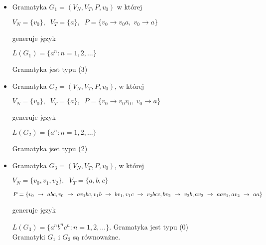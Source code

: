 \documentclass[main.tex]{subfiles}
\begin{document}
    \begin{itemize}
        \item Gramatyka $G_1 = (V_N,V_T,P,v_0)$ w której

        $V_N = \{v_0\}, \;\; V_T = \{a\}, \;\; P = \{ v_0 \rightarrow v_0 a, \; v_0 \rightarrow a \}$

        generuje język

        $L(G_1) = \{ a^n : n = 1,2,\dots \}$

        Gramatyka jest typu (3)

        \item Gramatyka $G_2 = (V_N,V_T,P,v_0)$, w której

        $V_N = \{v_0\}, \;\; V_T = \{a\}, \;\; P = \{ v_0 \rightarrow v_0 v_0, \; v_0 \rightarrow a \}$

        generuje język


        $L(G_2) = \{ a^n : n = 1,2,\dots \}$

        Gramatyka jset typu (2)


        \item Gramatyka $G_3 = (V_N,V_T,P,v_0)$, w której

        $V_N = \{v_0, v_1, v_2 \}, \;\; V_T = \{a,b,c\}$

        $P=\{v_0~\rightarrow~abc, v_0~\rightarrow~a v_1 bc, v_1 b~\rightarrow~b v_1,v_1 c~\rightarrow~v_2 bcc, bv_2~\rightarrow~ v_2 b,  \\ av_2~\rightarrow~aav_1, av_2~\rightarrow~aa\}$

        generuje język

        $L(G_3) = \{ a^n b^n c^n : n = 1,2,\dots \}$.
        Gramatyka jest typu (0)
        \\

        Gramatyki $G_1$ i $G_2$ są równoważne.
    \end{itemize}

    \newpage
\end{document}
